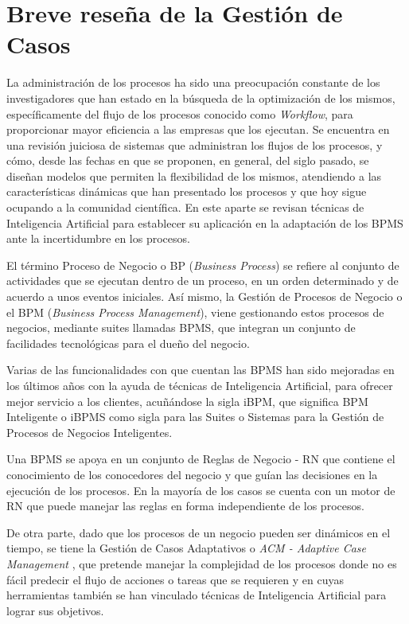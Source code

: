 \chapter{Breve reseña de la Gestión de Casos}
\label{BPM}

La administración de los procesos ha sido una preocupación constante de los investigadores que han estado en la búsqueda de la optimización de los mismos, específicamente del flujo de los procesos conocido como \textit{Workflow}, para proporcionar mayor eficiencia a las empresas que los ejecutan. Se encuentra en \citet{van2005case} una revisión juiciosa de sistemas que administran los flujos de los procesos, y cómo, desde las fechas en que se proponen, en general, del siglo pasado, se diseñan modelos que permiten la flexibilidad de los mismos, atendiendo a las características dinámicas que han presentado los procesos y que hoy sigue ocupando a la comunidad científica. En este aparte se revisan técnicas de Inteligencia Artificial para establecer su aplicación en la adaptación de los BPMS ante la incertidumbre en los procesos.

El término Proceso de Negocio o BP (\textit{Business Process}) se refiere al conjunto de actividades que se ejecutan dentro de un proceso, en un orden determinado y de acuerdo a unos eventos iniciales. Así mismo, la Gestión de Procesos de Negocio o el BPM (\textit{Business Process Management}), viene gestionando estos procesos de negocios, mediante suites llamadas BPMS, que integran un conjunto de facilidades tecnológicas para el dueño del negocio. 

Varias de las funcionalidades con que cuentan las BPMS han sido mejoradas en los últimos años con la ayuda de técnicas de Inteligencia Artificial, para ofrecer mejor servicio a los clientes, acuñándose la sigla iBPM, que significa BPM Inteligente o iBPMS como sigla para las Suites o Sistemas para la Gestión de Procesos de Negocios Inteligentes.

Una BPMS se apoya en un conjunto de Reglas de Negocio - RN que contiene el conocimiento de los conocedores del negocio y que guían las decisiones en la ejecución de los procesos. En la mayoría de los casos se cuenta con un motor de RN que puede manejar las reglas en forma independiente de los procesos.

De otra parte, dado que los procesos de un negocio pueden ser dinámicos en el tiempo, se tiene la Gestión de Casos Adaptativos o \textit{ACM - Adaptive Case Management} \citep{pucher2010elements}, que pretende manejar la complejidad de los procesos donde no es fácil predecir el flujo de acciones o tareas que se requieren y en cuyas herramientas también se han vinculado técnicas de Inteligencia Artificial para lograr sus objetivos. 

